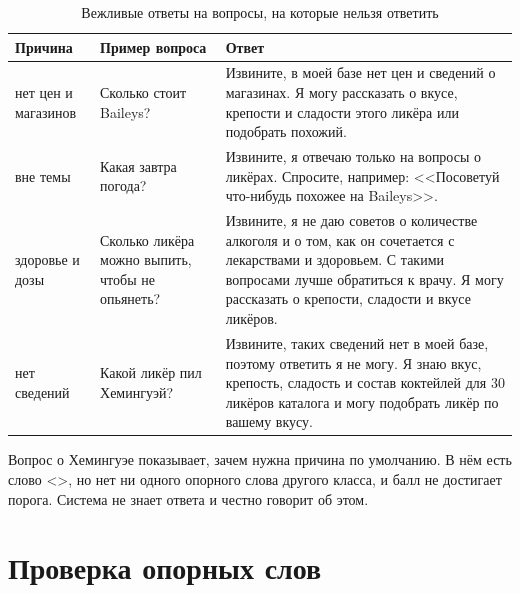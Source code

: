 \begin{table}[H]
	\centering
	\caption{Вежливые ответы на вопросы, на которые нельзя ответить}
	\label{tab:lr5_refusals}
	\footnotesize
	\begin{tabular}{|L{2.4cm}|L{3.6cm}|L{9.0cm}|}
		\hline
		Причина & Пример вопроса & Ответ \\ \hline
		нет цен и магазинов & Сколько стоит Baileys? & Извините, в моей базе нет цен и сведений о магазинах. Я могу рассказать о вкусе, крепости и сладости этого ликёра или подобрать похожий. \\ \hline
		вне темы & Какая завтра погода? & Извините, я отвечаю только на вопросы о ликёрах. Спросите, например: <<Посоветуй что-нибудь похожее на Baileys>>. \\ \hline
		здоровье и дозы & Сколько ликёра можно выпить, чтобы не опьянеть? & Извините, я не даю советов о количестве алкоголя и о том, как он сочетается с лекарствами и здоровьем. С такими вопросами лучше обратиться к врачу. Я могу рассказать о крепости, сладости и вкусе ликёров. \\ \hline
		нет сведений & Какой ликёр пил Хемингуэй? & Извините, таких сведений нет в моей базе, поэтому ответить я не могу. Я знаю вкус, крепость, сладость и состав коктейлей для 30 ликёров каталога и могу подобрать ликёр по вашему вкусу. \\ \hline
	\end{tabular}
\end{table}

Вопрос о Хемингуэе показывает, зачем нужна причина по умолчанию. В нём есть слово <>, но нет ни одного опорного слова другого класса, и балл не достигает порога. Система не знает ответа и честно говорит об этом.

\section{Проверка опорных слов}
\label{sec:lr5_check}

